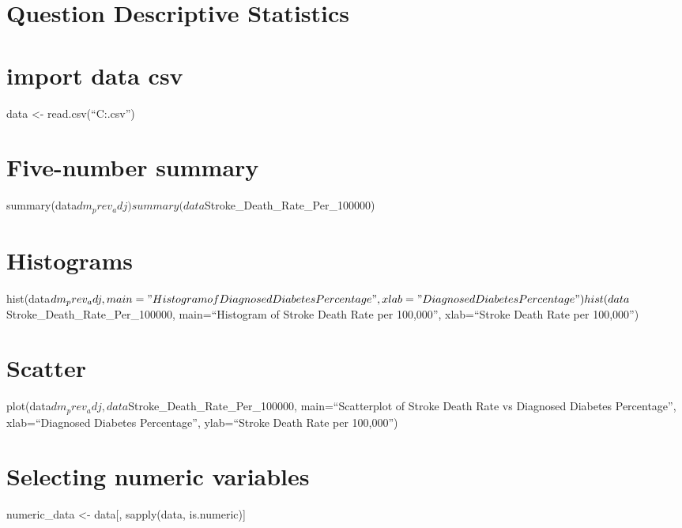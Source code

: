 \documentclass[
]{article}
\author{}
\date{\vspace{-2.5em}}
\begin{document}
\hypertarget{question-descriptive-statistics}{%
\section{Question Descriptive
Statistics}\label{question-descriptive-statistics}}

\hypertarget{import-data-csv}{%
\section{import data csv}\label{import-data-csv}}

data \textless-
read.csv(``C:\Users\lloyd\Documents\GitHub\rproject\rproject\deaths.csv'')

\hypertarget{five-number-summary}{%
\section{Five-number summary}\label{five-number-summary}}

summary(data\(dm_prev_adj) summary(data\)Stroke\_Death\_Rate\_Per\_100000)

\hypertarget{histograms}{%
\section{Histograms}\label{histograms}}

hist(data\(dm_prev_adj, main="Histogram of Diagnosed Diabetes Percentage", xlab="Diagnosed Diabetes Percentage") hist(data\)Stroke\_Death\_Rate\_Per\_100000,
main=``Histogram of Stroke Death Rate per 100,000'', xlab=``Stroke Death
Rate per 100,000'')

\hypertarget{scatter}{%
\section{Scatter}\label{scatter}}

plot(data\(dm_prev_adj, data\)Stroke\_Death\_Rate\_Per\_100000,
main=``Scatterplot of Stroke Death Rate vs Diagnosed Diabetes
Percentage'', xlab=``Diagnosed Diabetes Percentage'', ylab=``Stroke
Death Rate per 100,000'')

\hypertarget{selecting-numeric-variables}{%
\section{Selecting numeric
variables}\label{selecting-numeric-variables}}

numeric\_data \textless- data{[}, sapply(data, is.numeric){]}
\end{document}
